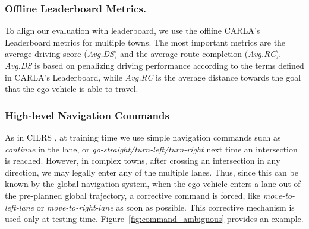 \subsubsection{Offline Leaderboard Metrics.}\label{lb_metrics}
\hspace{1pc}To align our evaluation with leaderboard\cite{Hu:2022}, we use the offline CARLA's Leaderboard metrics for multiple towns. 
The most important metrics are the average driving score (\emph{Avg.DS}) and the average route completion (\emph{Avg.RC}). 
\emph{Avg.DS} is based on penalizing driving performance according to the terms defined in CARLA's Leaderboard, 
while \emph{Avg.RC} is the average distance towards the goal that the ego-vehicle is able to travel.


\subsubsection{High-level Navigation Commands} 
\hspace{1pc}As in CILRS \cite{Codevilla:2019}, at training time we use simple navigation commands such as \emph{continue} in the lane, or \emph{go-straight/turn-left/turn-right} next time an intersection is reached. 
However, in complex towns, after crossing an intersection in any direction, we may legally enter any of the multiple lanes. 
Thus, since this can be known by the global navigation system, when the ego-vehicle enters a lane out of the pre-planned global trajectory, a corrective command is forced, like \emph{move-to-left-lane} or  \emph{move-to-right-lane} as soon as possible. 
This corrective mechanism is used only at testing time. 
Figure~\ref{fig:command_ambiguous} provides an example.

